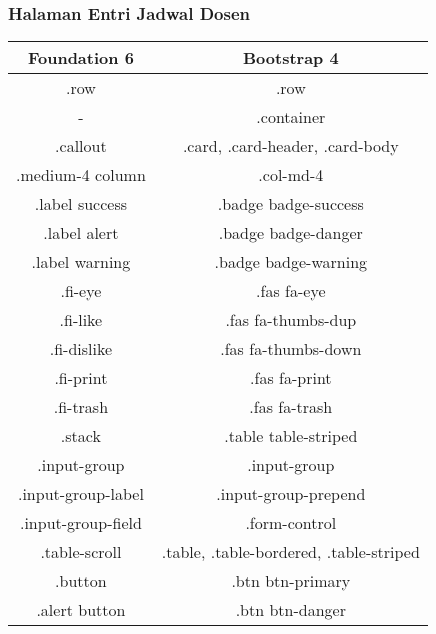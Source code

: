 \subsubsection{Halaman Entri Jadwal Dosen}
\begin{tabular}{|c|c|} 
	\hline
	\textbf{Foundation 6} & \textbf{Bootstrap 4}  \\ [0.5ex] 
	\hline\hline
	.row &   .row\\ 
	\hline	
	- &  .container \\
	\hline	
	.callout &  .card, .card-header, .card-body \\
	\hline
	.medium-4 column &  .col-md-4 \\
	\hline		
	.label success &  .badge badge-success \\
	\hline	
	.label alert & .badge badge-danger  \\
	\hline	
	.label warning & .badge badge-warning  \\
	\hline	
	.fi-eye &  .fas fa-eye \\
	\hline	
	.fi-like &  .fas fa-thumbs-dup \\	
	\hline	
	.fi-dislike &  .fas fa-thumbs-down \\
	\hline	
	.fi-print &  .fas fa-print \\
	\hline	
	.fi-trash &  .fas fa-trash \\
	\hline	
	.stack & .table table-striped  \\
	\hline	
	.input-group & .input-group  \\ 
	\hline	
	.input-group-label & .input-group-prepend  \\ 
	\hline	
	.input-group-field & .form-control \\ 	
	
	\hline	
	.table-scroll & .table, .table-bordered, .table-striped \\
	\hline	
	.button & .btn btn-primary  \\
	\hline	
	.alert button & .btn btn-danger  \\ [1ex] 
	\hline
\end{tabular}
